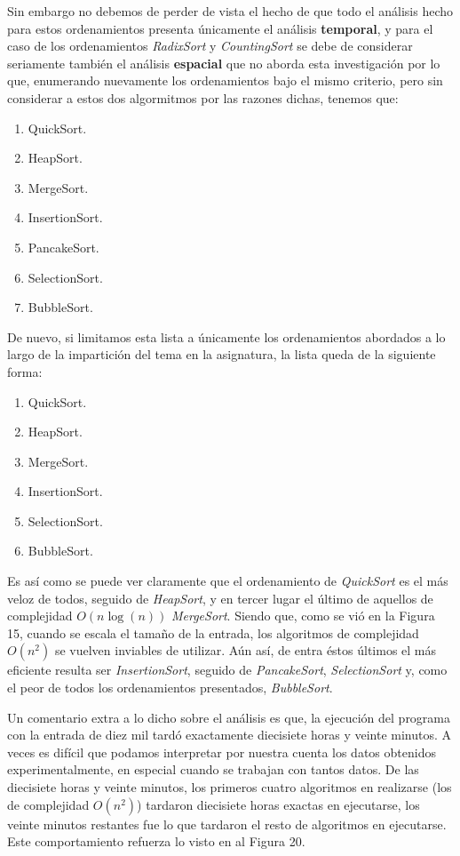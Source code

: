 \documentclass[a4paper,12pt]{article}
\begin{document}
Sin embargo no debemos de perder de vista el hecho de que todo el análisis hecho para estos ordenamientos presenta únicamente el análisis \textbf{temporal}, y para el caso de los ordenamientos \textit{RadixSort} y \textit{CountingSort} se debe de considerar seriamente también el análisis \textbf{espacial} que no aborda esta investigación por lo que, enumerando nuevamente los ordenamientos bajo el mismo criterio, pero sin considerar a estos dos algormitmos por las razones dichas, tenemos que:

\begin{enumerate}
    \item QuickSort.
    \item HeapSort.
    \item MergeSort.
    \item InsertionSort.
    \item PancakeSort.
    \item SelectionSort.
    \item BubbleSort.
\end{enumerate}

De nuevo, si limitamos esta lista a únicamente los ordenamientos abordados a lo largo de la impartición del tema en la asignatura, la lista queda de la siguiente forma:

\begin{enumerate}
    \item QuickSort.
    \item HeapSort.
    \item MergeSort.
    \item InsertionSort.
    \item SelectionSort.
    \item BubbleSort.
\end{enumerate}

Es así como se puede ver claramente que el ordenamiento de \textit{QuickSort} es el más veloz de todos, seguido de \textit{HeapSort}, y en tercer lugar el último de aquellos de complejidad $O(n\log(n))$ \textit{MergeSort}. Siendo que, como se vió en la Figura 15, cuando se escala el tamaño de la entrada, los algoritmos de complejidad $O(n^2)$ se vuelven inviables de utilizar. Aún así, de entra éstos últimos el más eficiente resulta ser \textit{InsertionSort}, seguido de \textit{PancakeSort}, \textit{SelectionSort} y, como el peor de todos los ordenamientos presentados, \textit{BubbleSort}.

Un comentario extra a lo dicho sobre el análisis es que, la ejecución del programa con la entrada de diez mil tardó exactamente diecisiete horas y veinte minutos. A veces es difícil que podamos interpretar por nuestra cuenta los datos obtenidos experimentalmente, en especial cuando se trabajan con tantos datos. De las diecisiete horas y veinte minutos, los primeros cuatro algoritmos en realizarse (los de complejidad $O(n^2)$) tardaron diecisiete horas exactas en ejecutarse, los veinte minutos restantes fue lo que tardaron el resto de algoritmos en ejecutarse. Este comportamiento refuerza lo visto en al Figura 20.
\end{document}
